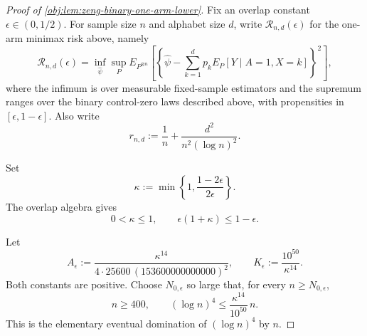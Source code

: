 \begin{proof}[Proof of \cref{obj:lem:zeng-binary-one-arm-lower}]
Fix an overlap constant \(\epsilon\in(0,1/2)\).  For sample size \(n\) and alphabet size \(d\), write \(\mathcal R_{n,d}(\epsilon)\) for the one-arm minimax risk above, namely
\[
\mathcal R_{n,d}(\epsilon)
=
\inf_{\widehat\psi}
\sup_P
E_{P^{\otimes n}}\left[
\left\{\widehat\psi-
\sum_{k=1}^d p_k E_P[Y\mid A=1,X=k]\right\}^2
\right],
\]
where the infimum is over measurable fixed-sample estimators and the supremum ranges over the binary control-zero laws described above, with propensities in \([\epsilon,1-\epsilon]\).  Also write
\[
r_{n,d}:=\frac1n+\frac{d^2}{n^2(\log n)^2}.
\]

Set
\[
\kappa:=\min\left\{1,\frac{1-2\epsilon}{2\epsilon}\right\}.
\]
The overlap algebra gives
\[
0<\kappa\le1,
\qquad
\epsilon(1+\kappa)\le 1-\epsilon .
\]

Let
\[
A_\epsilon:=\frac{\kappa^{14}}{4\cdot25600\,(153600000000000)^2},
\qquad
K_\epsilon:=\frac{10^{50}}{\kappa^{14}}.
\]
Both constants are positive.  Choose \(N_{0,\epsilon}\) so large that, for every \(n\ge N_{0,\epsilon}\),
\[
n\ge 400,
\qquad
(\log n)^4\le \frac{\kappa^{14}}{10^{50}}\,n .
\]
This is the elementary eventual domination of \((\log n)^4\) by \(n\).


\end{proof}
